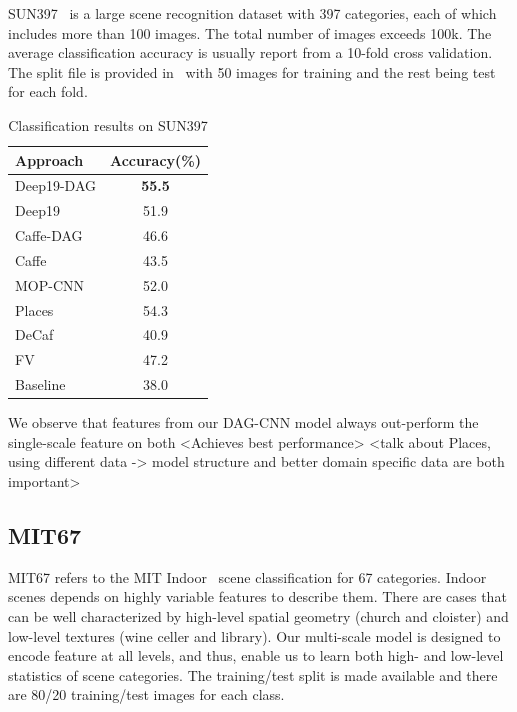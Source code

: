 \documentclass[10pt,twocolumn,letterpaper]{article}
\begin{document}
SUN397~\cite{SUN397} is a large scene recognition dataset with 397 categories, each of which includes more than 100 images. The total number of images exceeds 100k. The average classification accuracy is usually report from a 10-fold cross validation. The split file is provided in~\cite{SUN397} with 50 images for training and the rest being test for each fold.  


\begin{table}
\begin{center}
\begin{tabular}{|l|c|}
\hline
Approach & Accuracy(\%) \\
\hline
Deep19-DAG & \textbf{55.5} \\
Deep19~\cite{veryDeep} & 51.9 \\
Caffe-DAG & 46.6	\\
Caffe~\cite{Caffe} & 43.5 \\ \hline
MOP-CNN~\cite{Gong14} & 52.0 \\
Places~\cite{zhoulearning}	& 54.3	\\
DeCaf~\cite{DeCaf} & 40.9	\\
FV~\cite{FV} & 47.2 \\
Baseline~\cite{SUN397} & 38.0 \\
\hline
\end{tabular}
\end{center}
\caption{Classification results on SUN397}
\label{table:SUN397}
\end{table}

We observe that features from our DAG-CNN model always out-perform the single-scale feature on both 
<Achieves best performance>
<talk about Places, using different data -> model structure and better domain specific data are both important>


\subsection{MIT67}

MIT67 refers to the MIT Indoor~\cite{MIT67} scene classification for 67 categories. Indoor scenes depends on highly variable features to describe them. There are cases that can be well characterized by high-level spatial geometry (\eg church and cloister) and low-level textures (\eg wine celler and library). Our multi-scale model is designed to encode feature at all levels, and thus, enable us to learn both high- and low-level statistics of scene categories. The training/test split is made available and there are 80/20 training/test images for each class.
\end{document}
